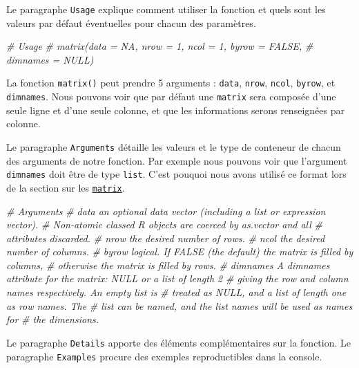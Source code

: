 \documentclass[]{book}
\newenvironment{Shaded}{\begin{snugshade}}{\end{snugshade}}
\newcommand{\CommentTok}[1]{\textcolor[rgb]{0.56,0.35,0.01}{\textit{#1}}}
\theoremstyle{definition}
\theoremstyle{definition}
\theoremstyle{definition}
\theoremstyle{remark}
\begin{document}
Le paragraphe \texttt{Usage} explique comment utiliser la fonction et
quels sont les valeurs par défaut éventuelles pour chacun des
paramètres.

\begin{Shaded}
\begin{Highlighting}[]
\CommentTok{# Usage}
\CommentTok{# matrix(data = NA, nrow = 1, ncol = 1, byrow = FALSE,}
\CommentTok{#        dimnames = NULL)}
\end{Highlighting}
\end{Shaded}

La fonction \texttt{matrix()} peut prendre 5 arguments : \texttt{data},
\texttt{nrow}, \texttt{ncol}, \texttt{byrow}, et \texttt{dimnames}. Nous
pouvons voir que par défaut une \texttt{matrix} sera composée d'une
seule ligne et d'une seule colonne, et que les informations serons
renseignées par colonne.

Le paragraphe \texttt{Arguments} détaille les valeurs et le type de
conteneur de chacun des arguments de notre fonction. Par exemple nous
pouvons voir que l'argument \texttt{dimnames} doit être de type
\texttt{list}. C'est pouquoi nous avons utilisé ce format lors de la
section sur les \protect\hyperlink{l014matrix}{\texttt{matrix}}.

\begin{Shaded}
\begin{Highlighting}[]
\CommentTok{# Arguments}
\CommentTok{# data      an optional data vector (including a list or expression vector). }
\CommentTok{#           Non-atomic classed R objects are coerced by as.vector and all }
\CommentTok{#           attributes discarded.}
\CommentTok{# nrow      the desired number of rows.}
\CommentTok{# ncol      the desired number of columns.}
\CommentTok{# byrow     logical. If FALSE (the default) the matrix is filled by columns, }
\CommentTok{#           otherwise the matrix is filled by rows.}
\CommentTok{# dimnames  A dimnames attribute for the matrix: NULL or a list of length 2 }
\CommentTok{#           giving the row and column names respectively. An empty list is }
\CommentTok{#           treated as NULL, and a list of length one as row names. The }
\CommentTok{#           list can be named, and the list names will be used as names for }
\CommentTok{#           the dimensions.}
\end{Highlighting}
\end{Shaded}

Le paragraphe \texttt{Details} apporte des éléments complémentaires sur
la fonction. Le paragraphe \texttt{Examples} procure des exemples
reproductibles dans la console.
\end{document}
